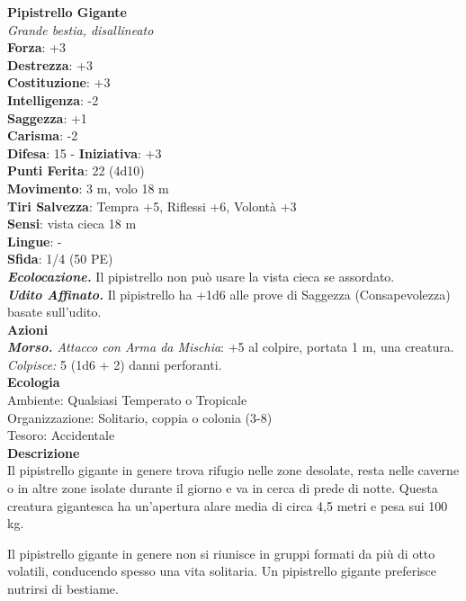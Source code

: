 \begin{multicols}{2}
\medskip\textbf{Pipistrello Gigante}\\
\emph{Grande bestia, disallineato}\\
\textbf{Forza}: +3\\
\textbf{Destrezza}: +3\\
\textbf{Costituzione}: +3\\
\textbf{Intelligenza}: -2\\
\textbf{Saggezza}: +1\\
\textbf{Carisma}: -2\\
\textbf{Difesa}: 15 - \textbf{Iniziativa}: +3\\
\textbf{Punti Ferita}: 22 (4d10)\\
\textbf{Movimento}: 3 m, volo 18 m\\
\textbf{Tiri Salvezza}: Tempra +5, Riflessi +6, Volontà +3 \\
\textbf{Sensi}: vista cieca 18 m\\
\textbf{Lingue}: -\\
\textbf{Sfida}: 1/4 (50 PE)\smallskip\\
\emph{\textbf{Ecolocazione.}} Il pipistrello non può usare la vista cieca se assordato.\\
\emph{\textbf{Udito Affinato.}} Il pipistrello ha +1d6 alle prove di Saggezza (Consapevolezza) basate sull'udito.\\
\smallskip\textbf{Azioni}\\
\emph{\textbf{Morso.} Attacco con Arma da Mischia}: +5 al colpire, portata 1 m, una creatura.\\
\emph{Colpisce:} 5 (1d6 + 2) danni perforanti.\\
\textbf{Ecologia}\\
Ambiente: Qualsiasi Temperato o Tropicale\\
Organizzazione: Solitario, coppia o colonia (3-8)\\
Tesoro: Accidentale \\
\textbf{Descrizione}\\

Il pipistrello gigante in genere trova rifugio nelle zone desolate, resta nelle caverne o in altre zone isolate durante il giorno e va in cerca di prede di notte. Questa creatura gigantesca ha un'apertura alare media di circa 4,5 metri e pesa sui 100 kg.

Il pipistrello gigante in genere non si riunisce in gruppi formati da più di otto volatili, conducendo spesso una vita solitaria. Un pipistrello gigante preferisce nutrirsi di bestiame. 


\end{multicols}
